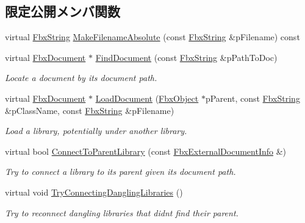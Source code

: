 \subsection*{限定公開メンバ関数}
\begin{DoxyCompactItemize}
\item 
virtual \hyperlink{class_fbx_string}{Fbx\+String} \hyperlink{class_fbx_external_doc_ref_listener_a0ccdcffe94bdebb645b119cbb8b8e452}{Make\+Filename\+Absolute} (const \hyperlink{class_fbx_string}{Fbx\+String} \&p\+Filename) const
\item 
virtual \hyperlink{class_fbx_document}{Fbx\+Document} $\ast$ \hyperlink{class_fbx_external_doc_ref_listener_a945c6cf13ded5425201a557a66f18723}{Find\+Document} (const \hyperlink{class_fbx_string}{Fbx\+String} \&p\+Path\+To\+Doc)
\begin{DoxyCompactList}\small\item\em Locate a document by its document path. \end{DoxyCompactList}\item 
virtual \hyperlink{class_fbx_document}{Fbx\+Document} $\ast$ \hyperlink{class_fbx_external_doc_ref_listener_adeb34f3aa94412bf637b42f9ee6cf78b}{Load\+Document} (\hyperlink{class_fbx_object}{Fbx\+Object} $\ast$p\+Parent, const \hyperlink{class_fbx_string}{Fbx\+String} \&p\+Class\+Name, const \hyperlink{class_fbx_string}{Fbx\+String} \&p\+Filename)
\begin{DoxyCompactList}\small\item\em Load a library, potentially under another library. \end{DoxyCompactList}\item 
virtual bool \hyperlink{class_fbx_external_doc_ref_listener_a68443ac6cc93f33279eaac41e7b23d7f}{Connect\+To\+Parent\+Library} (const \hyperlink{struct_fbx_external_document_info}{Fbx\+External\+Document\+Info} \&)
\begin{DoxyCompactList}\small\item\em Try to connect a library to its parent given its document path. \end{DoxyCompactList}\item 
virtual void \hyperlink{class_fbx_external_doc_ref_listener_a38eb0370ac40ed398430223cc2e9de5e}{Try\+Connecting\+Dangling\+Libraries} ()
\begin{DoxyCompactList}\small\item\em Try to reconnect dangling libraries that didn\textquotesingle{}t find their parent. \end{DoxyCompactList}\end{DoxyCompactItemize}


